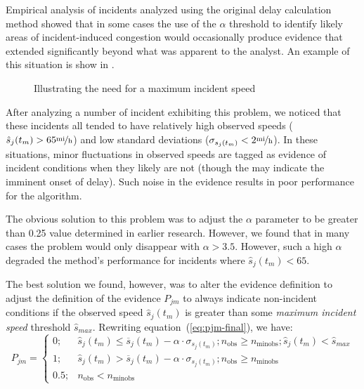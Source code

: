 \documentclass[12pt]{report}
\begin{document}
Empirical analysis of incidents analyzed using the original delay
calculation method showed that in some cases the use of the $\alpha$
threshold to identify likely areas of incident-induced congestion
would occasionally produce evidence that extended significantly beyond
what was apparent to the analyst.  An example of this situation is
show in .
\begin{figure}[t]
  \centering
  \caption{Illustrating the need for a maximum incident speed}
  \label{fig:max-inc-spd}
\end{figure}

After analyzing a number of incident exhibiting this problem, we
noticed that these incidents all tended to have relatively high
observed speeds ($\hat{s}_j(t_m)>65\unitfrac{mi}{h}$) and low standard
deviations ($\sigma_{s_j(t_m)}<2\unitfrac{mi}{h}$).  In these
situations, minor fluctuations in observed speeds are tagged as
evidence of incident conditions when they likely are not (though the
may indicate the imminent onset of delay).  Such noise in the evidence
results in poor performance for the algorithm.  

The obvious solution to this problem was to adjust the $\alpha$
parameter to be greater than 0.25 value determined in earlier
research.  However, we found that in many cases the problem would only
disappear with $\alpha>3.5$.  However, such a high $\alpha$ degraded
the method's performance for incidents where $\hat{s}_j(t_m)<65$.  

The best solution we found, however, was to alter the evidence
definition to adjust the definition of the evidence $P_{jm}$ to always
indicate non-incident conditions if the observed speed
$\hat{s}_j(t_m)$ is greater than some \emph{maximum incident speed}
threshold $\hat{s}_{max}$.  Rewriting equation~(\ref{eq:pjm-final}),
we have:
\begin{equation}
  \label{eq:pjm-final-2}
  P_{jm} = 
  \begin{cases}
    0;& \hat{s}_j(t_m) \le \overline{s}_j(t_m) - \alpha\cdot\sigma_{s_j(t_m)}; n_{\mathrm{obs}} \ge n_{\textrm{minobs}};\hat{s}_j(t_m) < \hat{s}_{max} \\
    1;& \hat{s}_j(t_m) > \overline{s}_j(t_m) - \alpha\cdot\sigma_{s_j(t_m)}; n_{\mathrm{obs}} \ge n_{\textrm{minobs}}\\
    0.5;& n_{\mathrm{obs}} < n_{\textrm{minobs}}
  \end{cases}
\end{equation}
\end{document}
